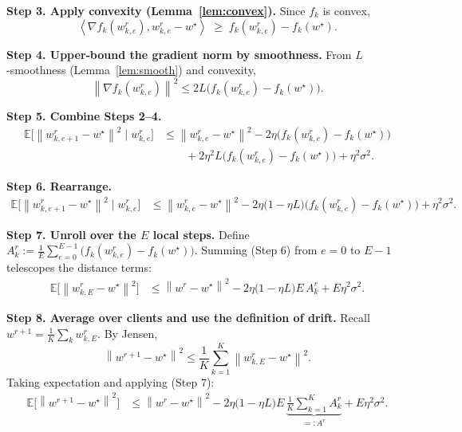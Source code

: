 \documentclass{article}
\newcommand{\E}{\mathbb{E}}
\newcommand{\norm}[1]{\left\lVert#1\right\rVert}
\newcommand{\ip}[2]{\left\langle #1,#2\right\rangle}
\begin{document}
\noindent\textbf{Step 3.  Apply convexity (Lemma~\ref{lem:convex}).}  
Since $f_k$ is convex,
\[
    \ip{\nabla f_k(w_{k,e}^{r})}{w_{k,e}^{r}-w^{\star}}
    \;\ge\; f_k(w_{k,e}^{r})-f_k(w^{\star}). \tag{Step 3}
\]

\noindent\textbf{Step 4.  Upper‑bound the gradient norm by smoothness.}  
From $L$‑smoothness (Lemma~\ref{lem:smooth}) and convexity,
\[
    \norm{\nabla f_k(w_{k,e}^{r})}^{2}
    \le 2L\big(f_k(w_{k,e}^{r})-f_k(w^{\star})\big). \tag{Step 4}
\]

\noindent\textbf{Step 5.  Combine Steps 2–4.}
\[
\begin{aligned}
    \E\!\big[\norm{w_{k,e+1}^{r}-w^{\star}}^{2}\mid w_{k,e}^{r}\big]
    &\le
    \norm{w_{k,e}^{r}-w^{\star}}^{2}
    -2\eta\big(f_k(w_{k,e}^{r})-f_k(w^{\star})\big)  \\
    &\qquad
    +2\eta^{2}L\big(f_k(w_{k,e}^{r})-f_k(w^{\star})\big)
    +\eta^{2}\sigma^{2}.
\end{aligned}
\tag{Step 5}
\]

\noindent\textbf{Step 6.  Rearrange.}
\[
\begin{aligned}
    \E\!\big[\norm{w_{k,e+1}^{r}-w^{\star}}^{2}\mid w_{k,e}^{r}\big]
    &\le
    \norm{w_{k,e}^{r}-w^{\star}}^{2}
    -2\eta\big(1-\eta L\big)\big(f_k(w_{k,e}^{r})-f_k(w^{\star})\big)
    +\eta^{2}\sigma^{2}. \tag{Step 6}
\end{aligned}
\]

\noindent\textbf{Step 7.  Unroll over the $E$ local steps.}  
Define $A_{k}^{r}:=\frac1E\sum_{e=0}^{E-1}\big(f_k(w_{k,e}^{r})-f_k(w^{\star})\big)$.  Summing (Step 6) from $e=0$ to $E-1$ telescopes the distance terms:
\[
\begin{aligned}
    \E\!\big[\norm{w_{k,E}^{r}-w^{\star}}^{2}\big]
    &\le
    \norm{w^{r}-w^{\star}}^{2}
    -2\eta\big(1-\eta L\big)E\,A_{k}^{r}
    +E\eta^{2}\sigma^{2}. \tag{Step 7}
\end{aligned}
\]

\noindent\textbf{Step 8.  Average over clients and use the definition of drift.}  
Recall $w^{r+1}= \frac1K\sum_{k} w_{k,E}^{r}$.  By Jensen,
\[
    \norm{w^{r+1}-w^{\star}}^{2}
    \le \frac1K\sum_{k=1}^{K}\norm{w_{k,E}^{r}-w^{\star}}^{2}.
\]
Taking expectation and applying (Step 7):
\[
\begin{aligned}
    \E\!\big[\norm{w^{r+1}-w^{\star}}^{2}\big]
    &\le
    \norm{w^{r}-w^{\star}}^{2}
    -2\eta\big(1-\eta L\big)E\,\underbrace{\frac1K\sum_{k=1}^{K}A_{k}^{r}}_{=:A^{r}}
    +E\eta^{2}\sigma^{2}. \tag{Step 8}
\end{aligned}
\]
\end{document}
